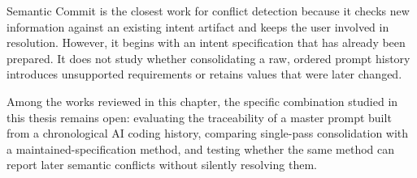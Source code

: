 Semantic Commit \citep{vaithilingam2025semanticcommit} is the closest work for
conflict detection because it checks new information against an existing
intent artifact and keeps the user involved in resolution. However, it begins
with an intent specification that has already been prepared. It does not
study whether consolidating a raw, ordered prompt history introduces
unsupported requirements or retains values that were later changed.

Among the works reviewed in this chapter, the specific combination studied in
this thesis remains open: evaluating the traceability of a master prompt built
from a chronological AI coding history, comparing single-pass consolidation
with a maintained-specification method, and testing whether the same method
can report later semantic conflicts without silently resolving them.
